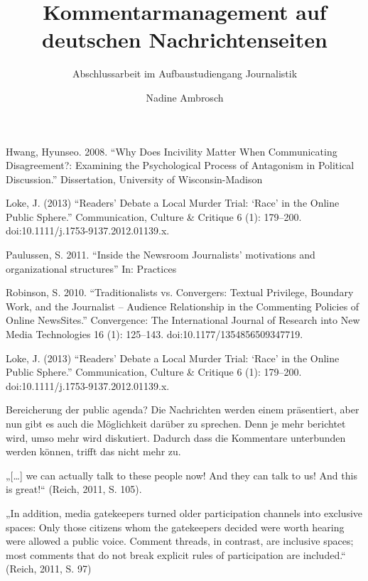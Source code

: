 \documentclass[12pt,parskip=full]{scrreprt} %
\title{Kommentarmanagement auf deutschen Nachrichtenseiten}
\subtitle{Abschlussarbeit im Aufbaustudiengang Journalistik}
\author{Nadine Ambrosch}
\begin{document}
\begin{spacing}{1}
  \maketitle
\end{spacing}

















Hwang, Hyunseo. 2008. “Why Does Incivility Matter When Communicating Disagreement?:
Examining the Psychological Process of Antagonism in Political Discussion.” Dissertation,
University of Wisconsin-Madison

Loke, J. (2013) “Readers’ Debate a Local Murder Trial: ‘Race’ in the Online
Public Sphere.” Communication, Culture \& Critique 6 (1): 179–200.
doi:10.1111/j.1753-9137.2012.01139.x.

Paulussen, S. 2011. ``Inside the Newsroom Journalists’ motivations and organizational structures'' In: Practices


Robinson, S. 2010. “Traditionalists vs. Convergers: Textual Privilege, Boundary Work, and the
Journalist – Audience Relationship in the Commenting Policies of Online NewsSites.”
Convergence: The International Journal of Research into New Media Technologies 16 (1):
125–143. doi:10.1177/1354856509347719.

Loke, J. (2013) “Readers’ Debate a Local Murder Trial: ‘Race’ in the Online
Public Sphere.” Communication, Culture \& Critique 6 (1): 179–200.
doi:10.1111/j.1753-9137.2012.01139.x.



Bereicherung der public agenda? Die Nachrichten werden einem präsentiert, aber
nun gibt es auch die Möglichkeit darüber zu sprechen. Denn je mehr berichtet
wird, umso mehr wird diskutiert. Dadurch dass die Kommentare unterbunden werden
können, trifft das nicht mehr zu.

 

„[\ldots] we can actually talk to these people now! And they can talk to us! And
this is great!“ (Reich, 2011, S. 105).

„In addition, media gatekeepers  turned older participation channels into
exclusive spaces: Only those citizens whom the gatekeepers decided were
worth hearing were allowed a public voice. Comment threads, in contrast,
are inclusive spaces; most comments that do not break explicit rules of
participation are included.“ (Reich, 2011, S. 97)
\end{document}
